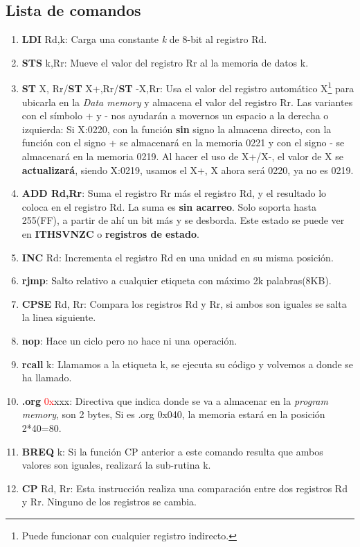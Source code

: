 \documentclass[
	12pt, %
	fleqn, %
	a4paper, %
]{LegrandOrangeBook}
\begin{document}
\subsection{Lista de comandos}
\begin{enumerate}
\item \textbf{LDI} Rd,k: Carga una constante \textit{k} de 8-bit al registro Rd.
\item \textbf{STS} k,Rr: Mueve el valor del registro Rr al la memoria de datos k.
\item \textbf{ST} X, Rr/\textbf{ST} X+,Rr/\textbf{ST} -X,Rr: Usa el valor del registro automático X\footnote{Puede funcionar con cualquier registro indirecto.} para ubicarla en la \textit{Data memory} y almacena el valor del registro Rr. Las variantes con el símbolo + y - nos ayudarán a movernos un espacio a la derecha o izquierda: Si X:0220, con la función \textbf{sin} signo la almacena directo, con la función con el signo + se almacenará en la memoria 0221 y con el signo - se almacenará en la memoria 0219. Al hacer el uso de X+/X-, el valor de X se \textbf{actualizará}, siendo X:0219, usamos el X+, X ahora será 0220, ya no es 0219.
\item \textbf{ADD Rd,Rr}: Suma el registro Rr más el registro Rd, y el resultado lo coloca en el registro Rd. La suma es \textbf{sin acarreo}. Solo soporta hasta 255(FF), a partir de ahí un bit más y se desborda. Este estado se puede ver en \textbf{ITHSVNZC} o \textbf{registros de estado}.
\item \textbf{INC} Rd: Incrementa el registro Rd en una unidad en su misma posición.
\item \textbf{rjmp}: Salto relativo a cualquier etiqueta con máximo 2k palabras(8KB).
\item \textbf{CPSE} Rd, Rr: Compara los registros Rd y Rr, si ambos son iguales se salta la linea siguiente.
\item \textbf{nop}: Hace un ciclo pero no hace ni una operación.
\item \textbf{rcall} k: Llamamos a la etiqueta k, se ejecuta su código y volvemos a donde se ha llamado.
\item \textbf{.org} \textcolor{red}{0x}xxx: Directiva que indica donde se va a almacenar en la \textit{program memory}, son 2 bytes, Si es .org 0x040, la memoria estará en la posición 2*40=80.
\item \textbf{BREQ} k: Si la función CP anterior a este comando resulta que ambos valores son iguales, realizará la sub-rutina k.
\item \textbf{CP} Rd, Rr: Esta instrucción realiza una comparación entre dos registros Rd y Rr. Ninguno de los registros se cambia.

\end{enumerate}
\end{document}
